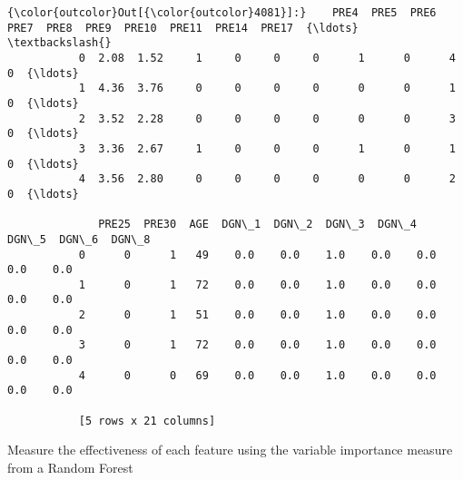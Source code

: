 \documentclass{article}
\begin{document}
            \begin{Verbatim}[commandchars=\\\{\}]
{\color{outcolor}Out[{\color{outcolor}4081}]:}    PRE4  PRE5  PRE6  PRE7  PRE8  PRE9  PRE10  PRE11  PRE14  PRE17  {\ldots}    \textbackslash{}
           0  2.08  1.52     1     0     0     0      1      0      4      0  {\ldots}     
           1  4.36  3.76     0     0     0     0      0      0      1      0  {\ldots}     
           2  3.52  2.28     0     0     0     0      0      0      3      0  {\ldots}     
           3  3.36  2.67     1     0     0     0      1      0      1      0  {\ldots}     
           4  3.56  2.80     0     0     0     0      0      0      2      0  {\ldots}     
           
              PRE25  PRE30  AGE  DGN\_1  DGN\_2  DGN\_3  DGN\_4  DGN\_5  DGN\_6  DGN\_8  
           0      0      1   49    0.0    0.0    1.0    0.0    0.0    0.0    0.0  
           1      0      1   72    0.0    0.0    1.0    0.0    0.0    0.0    0.0  
           2      0      1   51    0.0    0.0    1.0    0.0    0.0    0.0    0.0  
           3      0      1   72    0.0    0.0    1.0    0.0    0.0    0.0    0.0  
           4      0      0   69    0.0    0.0    1.0    0.0    0.0    0.0    0.0  
           
           [5 rows x 21 columns]
\end{Verbatim}
        
    Measure the effectiveness of each feature using the variable importance
measure from a Random Forest
\end{document}
